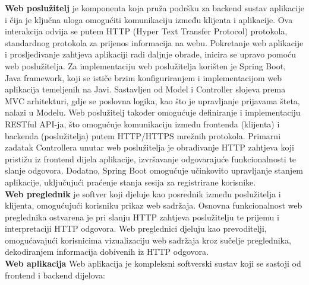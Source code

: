 \noindent\textbf{Web poslužitelj} je komponenta koja pruža podršku za backend sustav aplikacije i čija je ključna uloga omogućiti komunikaciju između klijenta i aplikacije. Ova interakcija odvija se putem HTTP (Hyper Text Transfer Protocol) protokola, standardnog protokola za prijenos informacija na webu. Pokretanje web aplikacije i prosljeđivanje zahtjeva aplikaciji radi daljnje obrade, inicira se upravo pomoću web poslužitelja. Za implementaciju web poslužitelja korišten je Spring Boot, Java framework, koji se ističe brzim konfiguriranjem i implementacijom web aplikacija temeljenih na Javi. Sastavljen od Model i Controller slojeva prema MVC arhitekturi, gdje se poslovna logika, kao što je upravljanje prijavama šteta, nalazi u Modelu. Web poslužitelj također omogućuje definiranje i implementaciju RESTful API-ja, što omogućuje komunikaciju između frontenda (klijenta) i backenda (poslužitelja) putem HTTP/HTTPS mrežnih protokola. Primarni zadatak Controllera unutar web poslužitelja je obrađivanje HTTP zahtjeva koji pristižu iz frontend dijela aplikacije, izvršavanje odgovarajuće funkcionalnosti te slanje odgovora. Dodatno, Spring Boot omogućuje učinkovito upravljanje stanjem aplikacije, uključujući praćenje stanja sesija za registrirane korisnike.
\newline
\textbf{\\Web preglednik} je softver koji djeluje kao posrednik između poslužitelja i klijenta, omogućujući korisniku prikaz web sadržaja. Osnovna funkcionalnost web preglednika ostvarena je pri slanju HTTP zahtjeva poslužitelju te prijemu i interpretaciji HTTP odgovora. Web preglednici djeluju kao prevoditelji, omogućavajući korisnicima vizualizaciju web sadržaja kroz sučelje preglednika, dekodiranjem informacija dobivenih iz HTTP odgovora.
\newline
\textbf{\\Web aplikacija} Web aplikacija je kompleksni softverski sustav koji se sastoji od frontend i backend dijelova:
